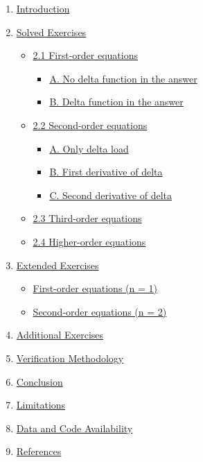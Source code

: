 \documentclass[
  11pt,
]{article}
\providecommand{\tightlist}{%
  \setlength{\itemsep}{0pt}\setlength{\parskip}{0pt}}
\begin{document}
\begin{enumerate}
\def\labelenumi{\arabic{enumi}.}
\tightlist
\item
  \protect\hyperlink{introduction}{Introduction}
\item
  \protect\hyperlink{solved-exercises}{Solved Exercises}

  \begin{itemize}
  \tightlist
  \item
    \protect\hyperlink{first-order-equations}{2.1 First-order equations}

    \begin{itemize}
    \tightlist
    \item
      \protect\hyperlink{first-order-a-no-delta}{A. No delta function in
      the answer}
    \item
      \protect\hyperlink{first-order-b-delta}{B. Delta function in the
      answer}
    \end{itemize}
  \item
    \protect\hyperlink{second-order-equations}{2.2 Second-order
    equations}

    \begin{itemize}
    \tightlist
    \item
      \protect\hyperlink{second-order-a-delta-load}{A. Only delta load}
    \item
      \protect\hyperlink{second-order-b-first-derivative}{B. First
      derivative of delta}
    \item
      \protect\hyperlink{second-order-c-second-derivative}{C. Second
      derivative of delta}
    \end{itemize}
  \item
    \protect\hyperlink{third-order-equations}{2.3 Third-order equations}
  \item
    \protect\hyperlink{higher-order-equations}{2.4 Higher-order
    equations}
  \end{itemize}
\item
  \protect\hyperlink{extended-exercises}{Extended Exercises}

  \begin{itemize}
  \tightlist
  \item
    \protect\hyperlink{extended-n1}{First-order equations (n = 1)}
  \item
    \protect\hyperlink{extended-n2}{Second-order equations (n = 2)}
  \end{itemize}
\item
  \protect\hyperlink{additional-exercises}{Additional Exercises}
\item
  \protect\hyperlink{verification-methodology}{Verification Methodology}
\item
  \protect\hyperlink{conclusion}{Conclusion}
\item
  \protect\hyperlink{limitations}{Limitations}
\item
  \protect\hyperlink{data-and-code-availability}{Data and Code
  Availability}
\item
  \protect\hyperlink{references}{References}
\end{enumerate}
\end{document}
